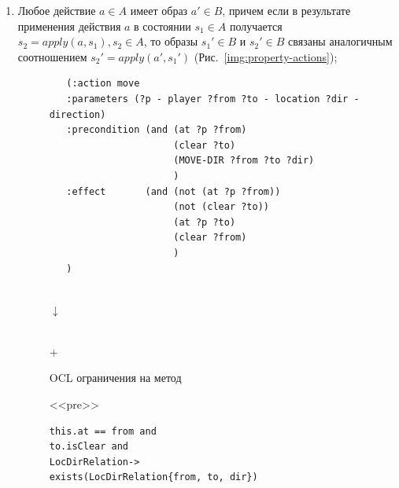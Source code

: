 \documentclass[a4paper,14pt]{extreport}
\begin{document}
\begin{enumerate}
\begin{enumerate}
        \end{enumerate}
        \item Любое действие $a \in A$ имеет образ $a' \in B$, причем если в результате применения действия $a$ в состоянии $s_1 \in A$ получается $s_2 = apply(a, s_1), s_2 \in A$, то образы $s_1' \in B$ и $s_2' \in B$ связаны аналогичным соотношением $s_2' = apply(a', s_1')$ (Рис.~\ref{img:property-actions});
        
\begin{figure}[H]
    \begin{minipage}[h]{1\linewidth}
        {\raggedright
        \small
        \begin{verbatim}
   (:action move
   :parameters (?p - player ?from ?to - location ?dir - direction)        
   :precondition (and (at ?p ?from)
                      (clear ?to)
                      (MOVE-DIR ?from ?to ?dir)
                      )
   :effect       (and (not (at ?p ?from))
                      (not (clear ?to))
                      (at ?p ?to)
                      (clear ?from)
                      )
   )
        \end{verbatim} 
        }
    \end{minipage} \\
    \vfill
    {\centering $\downarrow$ \\ }  
    \vfill
    \begin{minipage}[h]{1\linewidth}
    \end{minipage} \\
    \vfill
    {\centering $+$ \\ \medskip } 
    
        {\centering OCL\cite{ocl} ограничения на метод \\ \bigskip} 
        
        \hfill
        \begin{minipage}[h]{0.43\linewidth}
           {\centering <<pre>> \\}  
           {\raggedright
            \small
        
            \begin{verbatim}
this.at == from and 
to.isClear and
LocDirRelation->
exists(LocDirRelation{from, to, dir})
    

\end{verbatim}}
\end{minipage}
\end{figure}
\end{enumerate}
\end{document}
